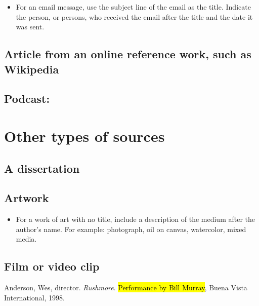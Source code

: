 {\begin{itemize}
\item For an email message, use the subject line of the email as the title. Indicate the person, or persons, who received the email after the title and the date it was sent.
\end{itemize}



\subsection{Article from an online reference work, such as Wikipedia}



\subsection{Podcast:}

\section{Other types of sources}

\subsection{A dissertation}

\subsection{Artwork}

\begin{itemize}\item For a work of art with no title, include a description of the medium after the author's name. For example: photograph, oil on canvas, watercolor, mixed media. \end{itemize}

\subsection{Film or video clip}
\bigskip

\noindent Anderson, Wes, director. \emph{Rushmore}. \hl{Performance by Bill Murray}, Buena Vista International, 1998.}\bigskip

